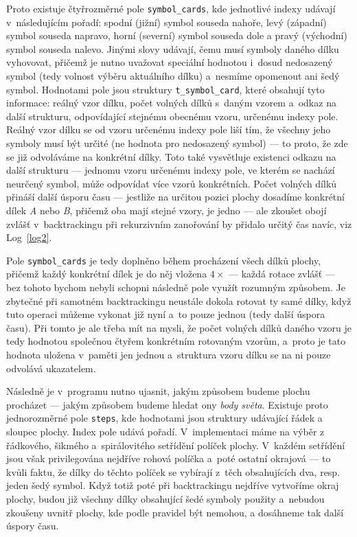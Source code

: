 \documentclass[11pt, titlepage]{report}
\begin{document}
Proto existuje čtyřrozměrné pole \texttt{symbol\_cards}, kde jednotlivé indexy udávají v~následujícím pořadí: spodní (jižní) symbol souseda nahoře, levý (západní) symbol souseda napravo, horní (severní) symbol souseda dole a pravý (východní) symbol souseda nalevo. Jinými slovy udávají, čemu musí symboly daného dílku vyhovovat, přičemž je nutno uvažovat speciální hodnotou i~dosud nedosazený symbol (tedy volnost výběru aktuálního dílku) a~nesmíme opomenout ani šedý symbol. Hodnotami pole jsou struktury \texttt{t\_symbol\_card}, které obsahují tyto informace: reálný vzor dílku, počet volných dílků s~daným vzorem a~odkaz na další strukturu, odpovídající stejnému obecnému vzoru, určenému indexy pole. Reálný vzor dílku se od vzoru určenému indexy pole liší tím, že všechny jeho symboly musí být určité (ne hodnota pro nedosazený symbol) --- to proto, že zde se již odvoláváme na konkrétní dílky. Toto také vysvětluje existenci odkazu na další strukturu --- jednomu vzoru určenému indexy pole, ve kterém se nachází neurčený symbol, může odpovídat více vzorů konkrétních. Počet volných dílků přináší další úsporu času --- jestliže na určitou pozici plochy dosadíme konkrétní dílek \emph{A} nebo \emph{B}, přičemž oba mají stejné vzory, je jedno --- ale zkoušet obojí zvlášť v~backtrackingu při rekurzivním zanořování by přidalo určitý čas navíc, viz Log~\ref{log2}.

Pole \texttt{symbol\_cards} je tedy doplněno během procházení všech dílků plochy, přičemž každý konkrétní dílek je do něj vložena $4 \times$ --- každá rotace zvlášť --- bez tohoto bychom nebyli schopni následně pole využít rozumným způsobem. Je zbytečné při samotném backtrackingu neustále dokola rotovat ty samé dílky, když tuto operaci můžeme vykonat již nyní a~to pouze jednou (tedy další úspora času). Při tomto je ale třeba mít na mysli, že počet volných dílků daného vzoru je tedy hodnotou společnou čtyřem konkrétním rotovaným vzorům, a~proto je tato hodnota uložena v~paměti jen jednou a~struktura vzoru dílku se na ni pouze odvolává ukazatelem.

Následně je v~programu nutno ujasnit, jakým způsobem budeme plochu procházet --- jakým způsobem budeme hledat ony \emph{body světa}. Existuje proto jednorozměrné pole \texttt{steps}, kde hodnotami jsou struktury udávající řádek a sloupec plochy. Index pole udává pořadí. V~implementaci máme na výběr z řádkového, šikmého a~spirálovitého setřídění políček plochy. V~každém setřídění jsou však privilegována nejdříve rohová políčka a~poté ostatní okrajová --- to kvůli faktu, že dílky do těchto políček se vybírají z~těch obsahujících dva, resp. jeden šedý symbol. Když totiž poté při backtrackingu nejdříve vytvoříme okraj plochy, budou již všechny dílky obsahující šedé symboly použity a~nebudou zkoušeny uvnitř plochy, kde podle pravidel být nemohou, a dosáhneme tak další úspory času.
\end{document}
